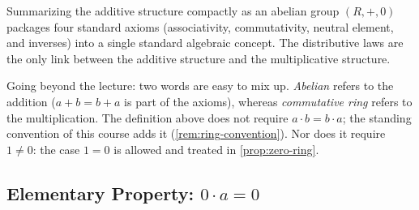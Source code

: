 \begin{content}
\begin{steps}
Summarizing the additive structure compactly as an abelian group $(R, +, 0)$ packages four standard axioms (associativity, commutativity, neutral element, and inverses) into a single standard algebraic concept. The distributive laws are the only link between the additive structure and the multiplicative structure.

Going beyond the lecture: two words are easy to mix up. \emph{Abelian} refers to the addition ($a + b = b + a$ is part of the axioms), whereas \emph{commutative ring} refers to the multiplication. The definition above does not require $a \cdot b = b \cdot a$; the standing convention of this course adds it (\cref{rem:ring-convention}). Nor does it require $1 \neq 0$: the case $1 = 0$ is allowed and treated in \cref{prop:zero-ring}.
\end{steps}
\end{content}

\subsection{Elementary Property: \texorpdfstring{$0 \cdot a = 0$}{0 * a = 0}}

